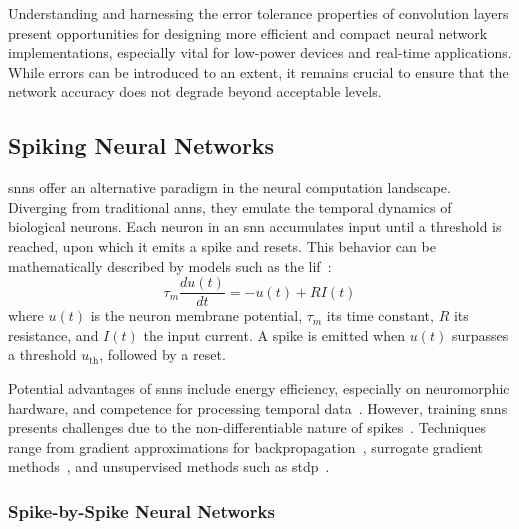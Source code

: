 Understanding and harnessing the error tolerance properties of convolution layers present opportunities for designing more efficient and compact neural network implementations, especially vital for low-power devices and real-time applications. While errors can be introduced to an extent, it remains crucial to ensure that the network accuracy does not degrade beyond acceptable levels.

\subsection{Spiking Neural Networks}

\glspl{snn} offer an alternative paradigm in the neural computation landscape. Diverging from traditional \glspl{ann}, they emulate the temporal dynamics of biological neurons. Each neuron in an \gls{snn} accumulates input until a threshold is reached, upon which it emits a spike and resets. This behavior can be mathematically described by models such as the \gls{lif}~\cite{gerstner2014neuronal}:
\begin{equation}
\tau_m \frac{du(t)}{dt} = -u(t) + RI(t)
\end{equation}
where \( u(t) \) is the neuron membrane potential, \( \tau_m \) its time constant, \( R \) its resistance, and \( I(t) \) the input current. A spike is emitted when \( u(t) \) surpasses a threshold \( u_{\text{th}} \), followed by a reset.

Potential advantages of \glspl{snn} include energy efficiency, especially on neuromorphic hardware, and competence for processing temporal data~\cite{merolla2014million}. However, training \glspl{snn} presents challenges due to the non-differentiable nature of spikes~\cite{neftci2019surrogate}. Techniques range from gradient approximations for backpropagation~\cite{lee2016training}, surrogate gradient methods~\cite{neftci2019surrogate}, and unsupervised methods such as \gls{stdp}~\cite{masquelier2007unsupervised}.

\subsubsection{Spike-by-Spike Neural Networks} 

\label{sec:sbs}

